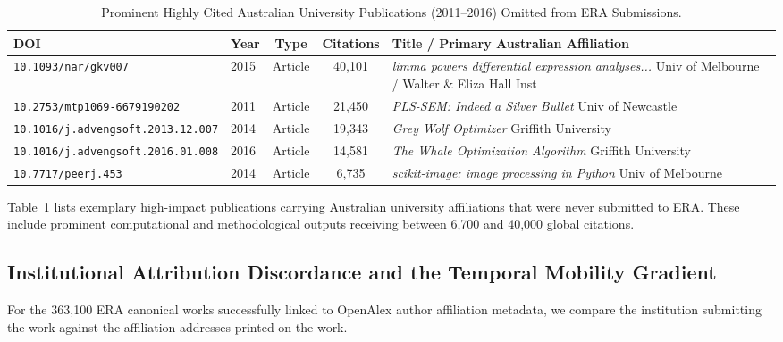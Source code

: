 \documentclass[11pt,a4paper]{article}
\begin{document}
\begin{table}[htbp]
\centering
\small
\caption{Prominent Highly Cited Australian University Publications (2011--2016) Omitted from ERA Submissions.}
\label{tab:high_cited_examples}
\begin{tabularx}{\textwidth}{llccX}
\toprule
\textbf{DOI} & \textbf{Year} & \textbf{Type} & \textbf{Citations} & \textbf{Title / Primary Australian Affiliation} \\
\midrule
\texttt{10.1093/nar/gkv007} & 2015 & Article & 40,101 & \textit{limma powers differential expression analyses...} \newline Univ of Melbourne / Walter \& Eliza Hall Inst \\
\addlinespace
\texttt{10.2753/mtp1069-6679190202} & 2011 & Article & 21,450 & \textit{PLS-SEM: Indeed a Silver Bullet} \newline Univ of Newcastle \\
\addlinespace
\texttt{10.1016/j.advengsoft.2013.12.007} & 2014 & Article & 19,343 & \textit{Grey Wolf Optimizer} \newline Griffith University \\
\addlinespace
\texttt{10.1016/j.advengsoft.2016.01.008} & 2016 & Article & 14,581 & \textit{The Whale Optimization Algorithm} \newline Griffith University \\
\addlinespace
\texttt{10.7717/peerj.453} & 2014 & Article & 6,735 & \textit{scikit-image: image processing in Python} \newline Univ of Melbourne \\
\bottomrule
\end{tabularx}
\end{table}

Table~\ref{tab:high_cited_examples} lists exemplary high-impact publications carrying Australian university affiliations that were never submitted to ERA. These include prominent computational and methodological outputs receiving between 6,700 and 40,000 global citations.

\subsection{Institutional Attribution Discordance and the Temporal Mobility Gradient}

For the 363,100 ERA canonical works successfully linked to OpenAlex author affiliation metadata, we compare the institution submitting the work against the affiliation addresses printed on the work.
\end{document}
